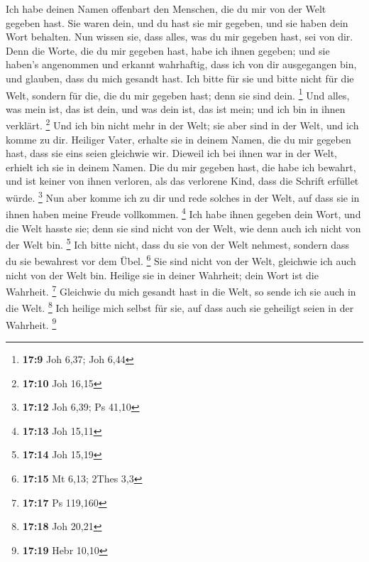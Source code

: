  Ich habe deinen Namen offenbart den Menschen, die du mir
von der Welt gegeben hast. Sie waren dein, und du hast sie mir gegeben,
und sie haben dein Wort behalten.  Nun wissen sie, dass
alles, was du mir gegeben hast, sei von dir.  Denn die
Worte, die du mir gegeben hast, habe ich ihnen gegeben; und sie haben's
angenommen und erkannt wahrhaftig, dass ich von dir ausgegangen bin, und
glauben, dass du mich gesandt hast.  Ich bitte für sie und
bitte nicht für die Welt, sondern für die, die du mir gegeben hast; denn
sie sind dein. \footnote{\textbf{17:9} Joh 6,37; Joh 6,44}
 Und alles, was mein ist, das ist dein, und was dein ist,
das ist mein; und ich bin in ihnen verklärt. \footnote{\textbf{17:10}
  Joh 16,15}  Und ich bin nicht mehr in der Welt; sie
aber sind in der Welt, und ich komme zu dir. Heiliger Vater, erhalte sie
in deinem Namen, die du mir gegeben hast, dass sie eins seien gleichwie
wir.  Dieweil ich bei ihnen war in der Welt, erhielt ich
sie in deinem Namen. Die du mir gegeben hast, die habe ich bewahrt, und
ist keiner von ihnen verloren, als das verlorene Kind, dass die Schrift
erfüllet würde. \footnote{\textbf{17:12} Joh 6,39; Ps 41,10}
 Nun aber komme ich zu dir und rede solches in der Welt,
auf dass sie in ihnen haben meine Freude vollkommen. \footnote{\textbf{17:13}
  Joh 15,11}  Ich habe ihnen gegeben dein Wort, und die
Welt hasste sie; denn sie sind nicht von der Welt, wie denn auch ich
nicht von der Welt bin. \footnote{\textbf{17:14} Joh 15,19}
 Ich bitte nicht, dass du sie von der Welt nehmest,
sondern dass du sie bewahrest vor dem Übel. \footnote{\textbf{17:15} Mt
  6,13; 2Thes 3,3}  Sie sind nicht von der Welt,
gleichwie ich auch nicht von der Welt bin.  Heilige sie
in deiner Wahrheit; dein Wort ist die Wahrheit. \footnote{\textbf{17:17}
  Ps 119,160}  Gleichwie du mich gesandt hast in die
Welt, so sende ich sie auch in die Welt. \footnote{\textbf{17:18} Joh
  20,21}  Ich heilige mich selbst für sie, auf dass auch
sie geheiligt seien in der Wahrheit. \footnote{\textbf{17:19} Hebr 10,10}

